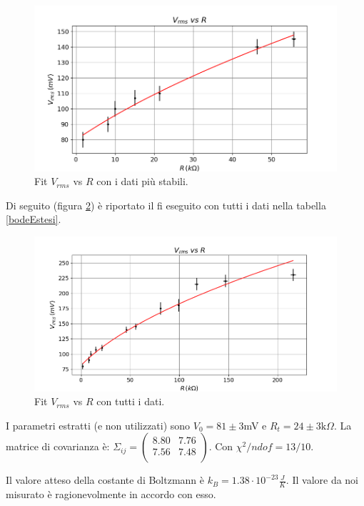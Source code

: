 \documentclass[10pt,a4paper]{article}
\begin{document}
\begin{figure}[!htb]
\centering
\includegraphics[scale=0.7]{boltzmann.png}
\caption{Fit $V_{rms}$ vs $R$ con i dati più stabili.\label{boltzmannFit}}
\end{figure}

Di seguito (figura \ref{boltzEstesi}) è riportato il fi eseguito con tutti i dati nella tabella \ref{bodeEstesi}.

\begin{figure}[!htb]
\centering
\includegraphics[scale=0.7]{boltzmannEstesoFit.png}
\caption{Fit $V_{rms}$ vs $R$ con tutti i dati.\label{boltzEstesi}}
\end{figure}

I parametri estratti (e non utilizzati) sono $V_0 = 81 \pm 3$mV e $R_t = 24 \pm 3 \mbox{k}\Omega$. La matrice di covarianza è:  $\Sigma_{ij} = \left( \begin{array}{cc}
8.80 & 7.76\\ 
7.56 & 7.48\\
\end{array} \right)$. Con $\chi^2/ndof = 13/10$.


Il valore atteso della costante di Boltzmann è $k_{B} = 1.38 \cdot 10^{-23} \frac{J}{K}$. Il valore da noi misurato è ragionevolmente in accordo con esso.
\end{document}
